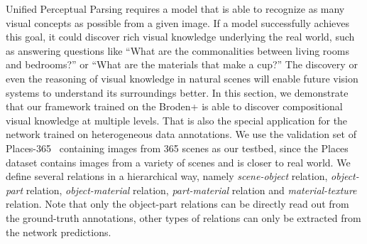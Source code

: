 \documentclass[runningheads]{llncs}
\begin{document}
Unified Perceptual Parsing requires a model that is able to recognize as many visual concepts as possible from a given image. If a model successfully achieves this goal, it could discover rich visual knowledge underlying the real world, such as answering questions like ``What are the commonalities between living rooms and bedrooms?'' or ``What are the materials that make a cup?'' The discovery or even the reasoning of visual knowledge in natural scenes will enable future vision systems to understand its surroundings better. In this section, we demonstrate that our framework trained on the Broden+ is able to discover compositional visual knowledge at multiple levels. That is also the special application for the network trained on heterogeneous data annotations. We use the validation set of Places-365~\cite{zhou2014learning} containing  images from 365 scenes as our testbed, since the Places dataset contains images from a variety of scenes and is closer to real world. We define several relations in a hierarchical way, namely \emph{scene-object} relation, \emph{object-part} relation, \emph{object-material} relation, \emph{part-material} relation and \emph{material-texture} relation. Note that only the object-part relations can be directly read out from the ground-truth annotations, other types of relations can only be extracted from the network predictions. 
\end{document}
